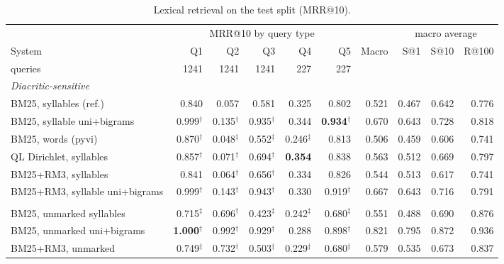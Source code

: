 \begin{table}[t]
\centering
\caption{Lexical retrieval on the test split (MRR@10).}
\label{tab:lexical}
\footnotesize
\setlength{\tabcolsep}{3.3pt}
\begin{tabular}{@{}l rrrrr r rrr@{}}
\toprule
 & \multicolumn{5}{c}{MRR@10 by query type} & & \multicolumn{3}{c}{macro average} \\
\cmidrule(lr){2-6} \cmidrule(l){8-10}
System & Q1 & Q2 & Q3 & Q4 & Q5 & Macro & S@1 & S@10 & R@100 \\
 \scriptsize{queries} & \scriptsize{1241} & \scriptsize{1241} & \scriptsize{1241} & \scriptsize{227} & \scriptsize{227} & & & & \\
\midrule
\multicolumn{10}{l}{\textit{Diacritic-sensitive}} \\
\quad BM25, syllables (ref.) & 0.840 & 0.057 & 0.581 & 0.325 & 0.802 & 0.521 & 0.467 & 0.642 & 0.776 \\
\quad BM25, syllable uni+bigrams & 0.999$^{\dagger}$ & 0.135$^{\dagger}$ & 0.935$^{\dagger}$ & 0.344 & \textbf{0.934}$^{\dagger}$ & 0.670 & 0.643 & 0.728 & 0.818 \\
\quad BM25, words (pyvi) & 0.870$^{\dagger}$ & 0.048$^{\ddagger}$ & 0.552$^{\ddagger}$ & 0.246$^{\ddagger}$ & 0.813 & 0.506 & 0.459 & 0.606 & 0.741 \\
\quad QL Dirichlet, syllables & 0.857$^{\dagger}$ & 0.071$^{\dagger}$ & 0.694$^{\dagger}$ & \textbf{0.354} & 0.838 & 0.563 & 0.512 & 0.669 & 0.797 \\
\quad BM25+RM3, syllables & 0.841 & 0.064$^{\dagger}$ & 0.656$^{\dagger}$ & 0.334 & 0.826 & 0.544 & 0.513 & 0.617 & 0.741 \\
\quad BM25+RM3, syllable uni+bigrams & 0.999$^{\dagger}$ & 0.143$^{\dagger}$ & 0.943$^{\dagger}$ & 0.330 & 0.919$^{\dagger}$ & 0.667 & 0.643 & 0.716 & 0.791 \\
\addlinespace
\multicolumn{10}{l}{\textit{Diacritic-insensitive}} \\
\quad BM25, unmarked syllables & 0.715$^{\ddagger}$ & 0.696$^{\dagger}$ & 0.423$^{\ddagger}$ & 0.242$^{\ddagger}$ & 0.680$^{\ddagger}$ & 0.551 & 0.488 & 0.690 & 0.876 \\
\quad BM25, unmarked uni+bigrams & \textbf{1.000}$^{\dagger}$ & 0.992$^{\dagger}$ & 0.929$^{\dagger}$ & 0.288 & 0.898$^{\dagger}$ & 0.821 & 0.795 & 0.872 & 0.936 \\
\quad BM25+RM3, unmarked & 0.749$^{\ddagger}$ & 0.732$^{\dagger}$ & 0.503$^{\ddagger}$ & 0.229$^{\ddagger}$ & 0.680$^{\ddagger}$ & 0.579 & 0.535 & 0.673 & 0.837 \\

\end{tabular}
\end{table}
